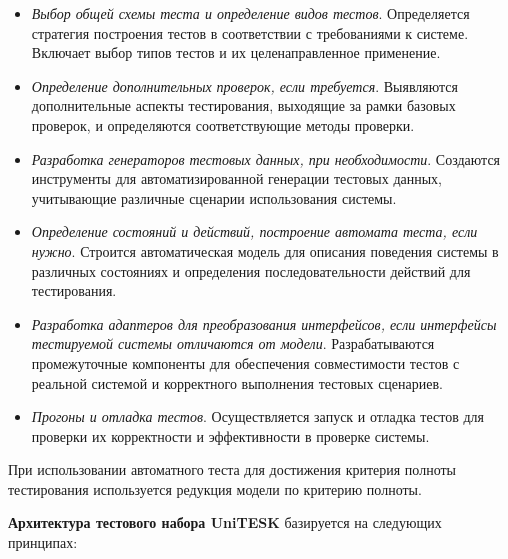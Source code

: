 \begin{itemize}
    \item \textit{Выбор общей схемы теста и определение видов тестов}. Определяется стратегия построения тестов в соответствии с требованиями к системе. Включает выбор типов тестов и их целенаправленное применение.
    \item \textit{Определение дополнительных проверок, если требуется}. Выявляются дополнительные аспекты тестирования, выходящие за рамки базовых проверок, и определяются соответствующие методы проверки.
    \item \textit{Разработка генераторов тестовых данных, при необходимости}. Создаются инструменты для автоматизированной генерации тестовых данных, учитывающие различные сценарии использования системы.
    \item \textit{Определение состояний и действий, построение автомата теста, если нужно}. Строится автоматическая модель для описания поведения системы в различных состояниях и определения последовательности действий для тестирования.
    \item \textit{Разработка адаптеров для преобразования интерфейсов, если интерфейсы тестируемой системы отличаются от модели}. Разрабатываются промежуточные компоненты для обеспечения совместимости тестов с реальной системой и корректного выполнения тестовых сценариев.
    \item \textit{Прогоны и отладка тестов}. Осуществляется запуск и отладка тестов для проверки их корректности и эффективности в проверке системы.
\end{itemize}

При использовании автоматного теста для достижения критерия полноты тестирования используется редукция модели по критерию полноты.


\textbf{Архитектура тестового набора UniTESK} базируется на следующих принципах:

